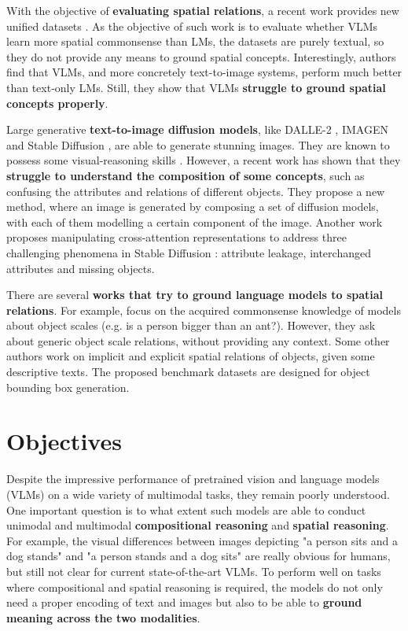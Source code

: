 With the objective of \textbf{evaluating spatial relations}, a recent work provides new unified datasets \cite{liu2022things}. As the objective of such work is to evaluate whether VLMs learn more spatial commonsense than LMs, the datasets are purely textual, so they do not provide any means to ground spatial concepts. Interestingly, authors find that VLMs, and more concretely text-to-image systems, perform much better than text-only LMs. Still, they show that VLMs \textbf{struggle to ground spatial concepts properly}.

Large generative \textbf{text-to-image diffusion models}, like DALLE-2 \cite{ramesh2022hierarchical}, IMAGEN \cite{saharia2022photorealistic} and Stable Diffusion \cite{rombach2021highresolution}, are able to generate stunning images. They are known to possess some visual-reasoning skills \cite{cho2022dall}. However, a recent work \cite{liu2022compositional} has shown that they \textbf{struggle to understand the composition of some concepts}, such as confusing the attributes and relations of different objects. They propose a new method, where an image is generated by composing a set of diffusion models, with each of them modelling a certain component of the image. Another work \cite{anonymous2023trainingfree} proposes manipulating cross-attention representations to address three challenging phenomena in Stable Diffusion \cite{rombach2021highresolution}: attribute leakage, interchanged attributes and missing objects.

There are several \textbf{works that try to ground language models to spatial relations}. For example, \cite{bagherinezhad2016elephants, elazar2019large} focus on the acquired commonsense knowledge of models about object scales (e.g. is a person bigger than an ant?). However, they ask about generic object scale relations, without providing any context. Some other authors \cite{collell2018acquiring, elu2021inferring} work on implicit and explicit spatial relations of objects, given some descriptive texts. The proposed benchmark datasets are designed for object bounding box generation.

\section{Objectives} \label{sec:objectives}

Despite the impressive performance of pretrained vision and language models (VLMs) on a wide variety of multimodal tasks, they remain poorly understood. One important question is to what extent such models are able to conduct unimodal and multimodal \textbf{compositional reasoning} and \textbf{spatial reasoning}. For example, the visual differences between images depicting "a person sits and a dog stands" and "a person stands and a dog sits" are really obvious for humans, but still not clear for current state-of-the-art VLMs. To perform well on tasks where compositional and spatial reasoning is required, the models do not only need a proper encoding of text and images but also to be able to \textbf{ground meaning across the two modalities}.

